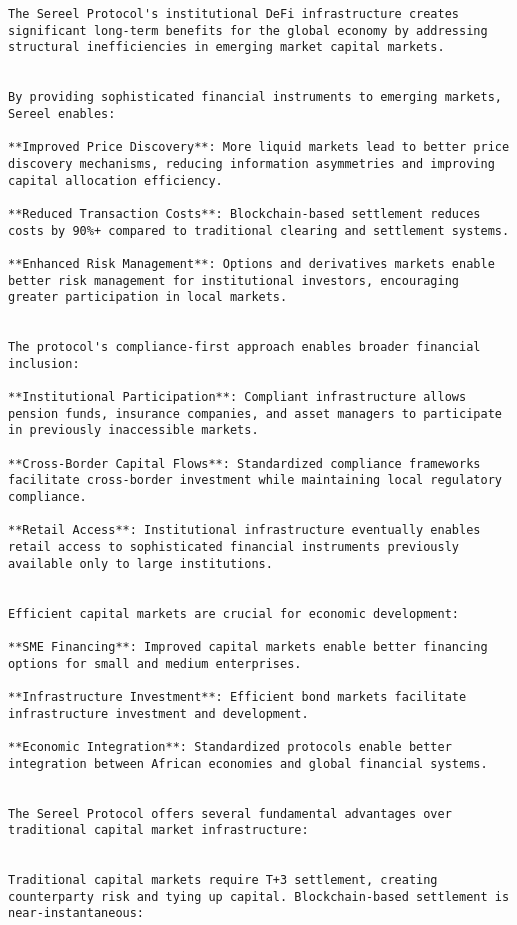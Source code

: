 \documentclass[12pt]{article}
\begin{document}
{{\begin{itemize}
\begin{lstlisting}
The Sereel Protocol's institutional DeFi infrastructure creates significant long-term benefits for the global economy by addressing structural inefficiencies in emerging market capital markets.


By providing sophisticated financial instruments to emerging markets, Sereel enables:

**Improved Price Discovery**: More liquid markets lead to better price discovery mechanisms, reducing information asymmetries and improving capital allocation efficiency.

**Reduced Transaction Costs**: Blockchain-based settlement reduces costs by 90%+ compared to traditional clearing and settlement systems.

**Enhanced Risk Management**: Options and derivatives markets enable better risk management for institutional investors, encouraging greater participation in local markets.


The protocol's compliance-first approach enables broader financial inclusion:

**Institutional Participation**: Compliant infrastructure allows pension funds, insurance companies, and asset managers to participate in previously inaccessible markets.

**Cross-Border Capital Flows**: Standardized compliance frameworks facilitate cross-border investment while maintaining local regulatory compliance.

**Retail Access**: Institutional infrastructure eventually enables retail access to sophisticated financial instruments previously available only to large institutions.


Efficient capital markets are crucial for economic development:

**SME Financing**: Improved capital markets enable better financing options for small and medium enterprises.

**Infrastructure Investment**: Efficient bond markets facilitate infrastructure investment and development.

**Economic Integration**: Standardized protocols enable better integration between African economies and global financial systems.


The Sereel Protocol offers several fundamental advantages over traditional capital market infrastructure:


Traditional capital markets require T+3 settlement, creating counterparty risk and tying up capital. Blockchain-based settlement is near-instantaneous:


\end{lstlisting}
\end{itemize}}}
\end{document}
